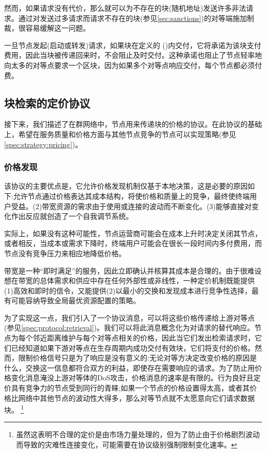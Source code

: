 然而，如果请求没有代价，那么就可以为不存在的块(随机地址)发送许多非法请求。通过对发送过多请求而请求不存在的块(参见\ref{sec:sanctions})的对等端施加制裁，很容易缓解这一问题。

一旦节点发起(启动或转发)请求，如果块在定义的 ()内交付，它将承诺为该块支付费用，因此当块被传递回来时，不会阻止及时交付。这种承诺也阻止了节点轻率地向太多的对等点要求一个区块，因为如果多个对等点响应交付，每个节点都必须付费。


\subsection{块检索的定价协议\statusgreen}\label{sec:pricing}

\green{}

接下来，我们描述了在群网络中，节点用来传递块的价格的协议。在此协议的基础上，希望在服务质量和价格方面与其他节点竞争的节点可以实现策略(参见\ref{spec:strategy:pricing})。 

\subsubsection{价格发现}\label{sec:retrieval-price-discovery}

该协议的主要优点是，它允许价格发现机制仅基于本地决策，这是必要的原因如下:允许节点通过价格表达其成本结构，将使价格和质量上的竞争，最终使终端用户受益。(2)带宽资源的需求由于使用或连接的波动而不断变化。(3)能够直接对变化作出反应就创造了一个自我调节系统。

实际上，如果没有这种可能性，节点运营商可能会在成本上升时决定关闭其节点，或者相反，当成本或需求下降时，终端用户可能会在很长一段时间内多付费用，而节点没有竞争压力来相应地降低价格。

带宽是一种“即时满足”的服务，因此立即确认并核算其成本是合理的。由于很难设想在带宽的总体需求和供应中存在任何外部性或非线性，一种定价机制既能提供(1)高效和即时的信令，又能提供(2)以最小的交换和发现成本进行竞争性选择，最有可能容纳导致全局最优资源配置的策略。

为了实现这一点，我们引入了一个协议消息，可以将这些价格传递给上游对等点(参见\ref{spec:protocol:retrieval})。我们可以将此消息概念化为对请求的替代响应。节点为每个邻近距离维护与每个对等点相关的价格，因此当它们发出检索请求时，它们已经知道如果下游对等点在生存周期内成功交付有效块，它们将支付的价格。然而，限制价格信号只是为了响应是没有意义的:无论对等方决定改变价格的原因是什么，交换这一信息都符合双方的利益，即使存在需要响应的请求。为了防止用价格变化消息淹没上游对等体的DoS攻击，价格消息的速率是有限的。行为良好且定价具有竞争力的节点受到同行的青睐;如果一个节点的价格设置得太高，或者其价格比网络中其他节点的波动性大得多，那么对等节点就不太愿意向它们请求数据块。%
%
\footnote{虽然这表明不合理的定价是由市场力量处理的，但为了防止由于价格剧烈波动而导致的灾难性连接变化，可能需要在协议级别强制限制变化速率。 }


